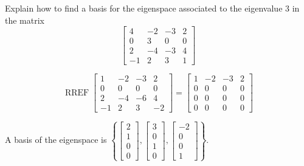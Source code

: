 
\begin{exerciseStatement}


Explain how to find a basis for the eigenspace associated to the eigenvalue \( 3 \) in the matrix \[ \left[\begin{array}{cccc}
4 & -2 & -3 & 2 \\
0 & 3 & 0 & 0 \\
2 & -4 & -3 & 4 \\
-1 & 2 & 3 & 1
\end{array}\right] \]


\end{exerciseStatement}
    
\begin{exerciseAnswer} 


\[\operatorname{RREF} \left[\begin{array}{cccc}
1 & -2 & -3 & 2 \\
0 & 0 & 0 & 0 \\
2 & -4 & -6 & 4 \\
-1 & 2 & 3 & -2
\end{array}\right] = \left[\begin{array}{cccc}
1 & -2 & -3 & 2 \\
0 & 0 & 0 & 0 \\
0 & 0 & 0 & 0 \\
0 & 0 & 0 & 0
\end{array}\right] \]



A basis of the eigenspace is \( \left\{ \left[\begin{array}{c}
2 \\
1 \\
0 \\
0
\end{array}\right] , \left[\begin{array}{c}
3 \\
0 \\
1 \\
0
\end{array}\right] , \left[\begin{array}{c}
-2 \\
0 \\
0 \\
1
\end{array}\right] \right\} \).


\end{exerciseAnswer}
    
